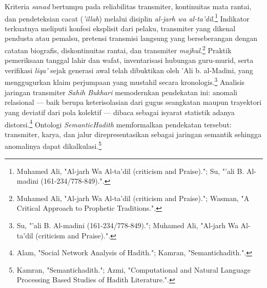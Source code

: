Kriteria \textit{sanad} bertumpu pada reliabilitas transmiter, kontinuitas mata rantai, dan pendeteksian cacat (\textit{'illah}) melalui disiplin \textit{al-jarh wa al-ta'dil}.\footnote{Muhamed Ali, "Al-jarh Wa Al-ta'dil (criticism and Praise)."; Su, "'ali B. Al-madini (161-234/778-849).".} Indikator terkuatnya meliputi konfesi eksplisit dari pelaku, transmiter yang dikenal pendusta atau pemalsu, pretensi transmisi langsung yang berseberangan dengan catatan biografis, diskontinuitas rantai, dan transmiter \textit{majhul}.\footnote{Muhamed Ali, "Al-jarh Wa Al-ta'dil (criticism and Praise)."; Wasman, "A Critical Approach to Prophetic Traditions.".} Praktik pemeriksaan tanggal lahir dan wafat, inventarisasi hubungan guru-murid, serta verifikasi \textit{liqa'} sejak generasi awal telah dibuktikan oleh 'Ali b. al-Madini, yang menggugurkan klaim perjumpaan yang mustahil secara kronologis.\footnote{Su, "'ali B. Al-madini (161-234/778-849)."; Muhamed Ali, "Al-jarh Wa Al-ta'dil (criticism and Praise).".} Analisis jaringan transmiter \textit{Sahih Bukhari} memodernkan pendekatan ini: anomali relasional --- baik berupa keterisolasian dari gugus seangkatan maupun trayektori yang deviatif dari pola kolektif --- dibaca sebagai isyarat statistik adanya distorsi.\footnote{Alam, "Social Network Analysis of Hadith."; Kamran, "Semantichadith.".} Ontologi \textit{SemanticHadith} memformalkan pendekatan tersebut: transmiter, karya, dan jalur direpresentasikan sebagai jaringan semantik sehingga anomalinya dapat dikalkulasi.\footnote{Kamran, "Semantichadith."; Azmi, "Computational and Natural Language Processing Based Studies of Hadith Literature.".}

